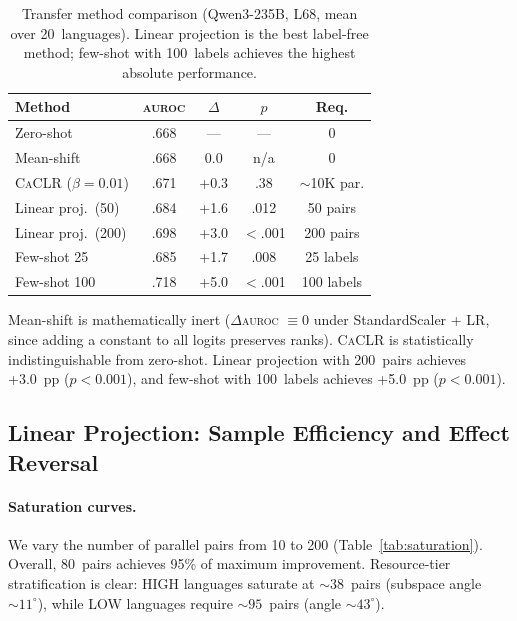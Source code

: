 \documentclass[11pt,a4paper]{article}
\newcommand{\aur}{\textsc{auroc}}
\newcommand{\caclr}{\textsc{CaCLR}}
\begin{document}
\begin{table}[t]
\centering
\small
\begin{tabular}{lcccc}
\toprule
\textbf{Method} & \textbf{\aur{}} & \textbf{$\Delta$} & \textbf{$p$} & \textbf{Req.} \\
\midrule
Zero-shot & .668 & --- & --- & 0 \\
Mean-shift & .668 & 0.0 & n/a & 0 \\
\caclr{} ($\beta{=}0.01$) & .671 & +0.3 & .38 & ${\sim}$10K par. \\
Linear proj.\ (50) & .684 & +1.6 & .012 & 50 pairs \\
Linear proj.\ (200) & .698 & +3.0 & $<$.001 & 200 pairs \\
Few-shot 25 & .685 & +1.7 & .008 & 25 labels \\
Few-shot 100 & .718 & +5.0 & $<$.001 & 100 labels \\
\bottomrule
\end{tabular}
\caption{Transfer method comparison (Qwen3-235B, L68, mean over 20~languages). Linear projection is the best label-free method; few-shot with 100~labels achieves the highest absolute performance.}
\label{tab:transfer_comparison}
\end{table}

Mean-shift is mathematically inert ($\Delta$\aur{} $\equiv 0$ under StandardScaler + LR, since adding a constant to all logits preserves ranks). \caclr{} is statistically indistinguishable from zero-shot. Linear projection with 200~pairs achieves +3.0~pp ($p<0.001$), and few-shot with 100~labels achieves +5.0~pp ($p<0.001$).

\subsection{Linear Projection: Sample Efficiency and Effect Reversal}
\label{sec:projection}

\paragraph{Saturation curves.}
We vary the number of parallel pairs from 10 to 200 (Table~\ref{tab:saturation}). Overall, 80~pairs achieves 95\% of maximum improvement. Resource-tier stratification is clear: HIGH languages saturate at ${\sim}38$~pairs (subspace angle ${\sim}11^\circ$), while LOW languages require ${\sim}95$~pairs (angle ${\sim}43^\circ$).
\end{document}
